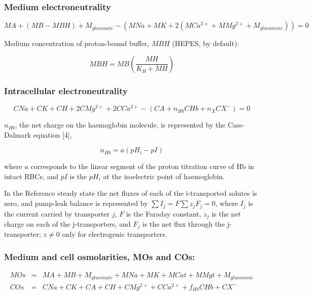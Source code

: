 \documentclass[a4paper]{article}
\newcommand{\med}[1]{M#1}
\newcommand{\cell}[1]{C#1}
\newcommand{\MA}{\med{A}}
\newcommand{\MB}{\med{B}}
\newcommand{\MBH}{\med{BH}}
\newcommand{\MGluca}{M_{glucamine}}
\newcommand{\MNa}{\med{Na}}
\newcommand{\MK}{\med{K}}
\newcommand{\MCatp}{\med{Ca^{2+}}}
\newcommand{\MMgtp}{\med{Mg^{2+}}}
\newcommand{\MGluco}{M_{gluconate}}
\newcommand{\MH}{\med{H}}
\newcommand{\MOs}{\med{Os}}
\newcommand{\MCat}{\med{Cat}}
\newcommand{\MMgt}{\med{Mgt}}
\newcommand{\KB}{K_B}
\newcommand{\CNa}{\cell{Na}}
\newcommand{\CK}{\cell{K}}
\newcommand{\CH}{\cell{H}}
\newcommand{\CMgtp}{\cell{Mg^{2+}}}
\newcommand{\CCatp}{\cell{Ca^{2+}}}
\newcommand{\CA}{\cell{A}}
\newcommand{\nHb}{n_{Hb}}
\newcommand{\CHb}{\cell{Hb}}
\newcommand{\nX}{n_{X}}
\newcommand{\CXm}{\cell{X^{-}}}
\newcommand{\COs}{\cell{Os}}
\newcommand{\pH}[1]{pH_{#1}}
\newcommand{\pI}{pI}
\newcommand{\fHb}{f_{Hb}}
\begin{document}
\subsubsection{Medium electroneutrality}\label{medium-electroneutrality}

\begin{equation}
\MA + (\MB - \MBH) + \MGluco-(\MNa + \MK + 2(\MCatp + \MMgtp + \MGluca)) = 0 \tag{1}
\end{equation}

Medium concentration of proton-bound buffer, $\MBH$ (HEPES, by default):

\setcounter{equation}{1}

\begin{equation}
\MBH = \MB\left(\frac{\MH}{\KB + \MH}\right)
\end{equation}

\subsubsection{Intracellular electroneutrality}

\begin{equation}
\CNa + \CK + \CH + 2\CMgtp + 2\CCatp - (\CA + \nHb\CHb + \nX\CXm) = 0
\end{equation}

$\nHb$, the net charge on the haemoglobin molecule, is represented by the Cass-Dalmark equation [4],

\begin{equation}
\nHb=  a(\pH{i} - \pI)
\end{equation}

where $a$ corresponds to the linear segment of the proton titration curve of Hb in intact RBCs, and $\pI$ is the $\pH{i}$ at the isoelectric point of haemoglobin.

In the Reference steady state the net fluxes of each of the i-transported solutes is zero, and pump-leak balance is represented by $\sum I_j = F\sum z_jF_j = 0$, where $I_j$ is the current carried by transporter $j$, $F$ is the Faraday constant, $z_j$ is the net charge on each of the j-transporters, and $F_j$ is the net flux through the j-transporter; $z \neq 0$ only for electrogenic transporters. 

\subsubsection{Medium and cell osmolarities, MOs and COs:}

\begin{eqnarray}
	\MOs &=& \MA + \MB + \MGluco + \MNa + \MK + \MCat + \MMgt + \MGluca\\
	\COs &=& \CNa + \CK + \CA + \CH + \CMgtp + \CCatp  + \fHb\CHb + \CXm
\end{eqnarray}
\end{document}
